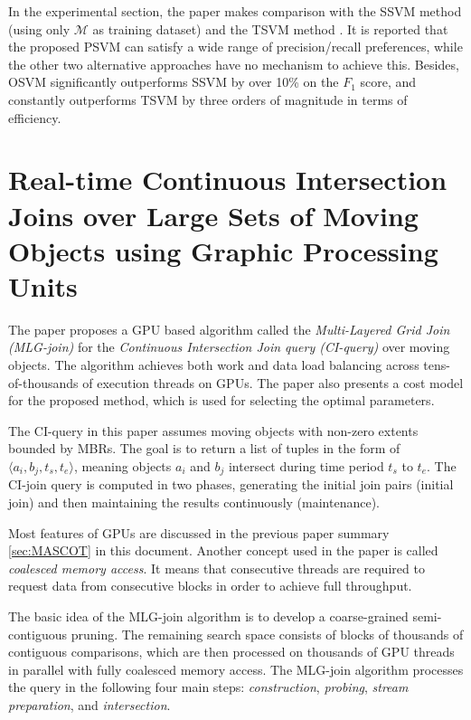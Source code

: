 \documentclass[paper=a4, fontsize=18pt]{article} %
\numberwithin{equation}{section} %
\numberwithin{figure}{section} %
\numberwithin{table}{section} %
\newcommand{\mM}{\mathcal{M}}
\begin{document}
In the experimental section, the paper makes comparison with the SSVM method (using only $\mM$ as training dataset) and the TSVM method \cite{J99}. It is reported that the proposed PSVM can satisfy a wide range of precision/recall preferences, while the other two alternative approaches have no mechanism to achieve this. Besides, OSVM significantly outperforms SSVM by over 10\% on the $F_1$ score, and constantly outperforms TSVM by three orders of magnitude in terms of efficiency.

\section{Real-time Continuous Intersection Joins over Large Sets of Moving Objects using Graphic Processing Units \cite{WH0Q14}}

The paper proposes a GPU based algorithm called the \emph{Multi-Layered Grid Join (MLG-join)} for the \emph{Continuous Intersection Join query (CI-query)} over moving objects. The algorithm achieves both work and data load balancing across tens-of-thousands of execution threads on GPUs. The paper also presents a cost model for the proposed method, which is used for selecting the optimal parameters.

The CI-query in this paper assumes moving objects with non-zero extents bounded by MBRs. The goal is to return a list of tuples in the form of $\langle a_i, b_j, t_s, t_e \rangle$, meaning objects $a_i$ and $b_j$ intersect during time period $t_s$ to $t_e$. The CI-join query is computed in two phases, generating the initial join pairs (initial join) and then maintaining the results continuously (maintenance).

Most features of GPUs are discussed in the previous paper summary \ref{sec:MASCOT} in this document. Another concept used in the paper is called \emph{coalesced memory access}. It means that consecutive threads are required to request data from consecutive blocks in order to achieve full throughput.

The basic idea of the MLG-join algorithm is to develop a coarse-grained semi-contiguous pruning. The remaining search space consists of blocks of thousands of contiguous comparisons, which are then processed on thousands of GPU threads in parallel with fully coalesced memory access. The MLG-join algorithm processes the query in the following four main steps: \emph{construction}, \emph{probing}, \emph{stream preparation}, and \emph{intersection}.
\end{document}
